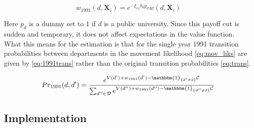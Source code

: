 \begin{equation}
    w_{1991}(d, \mathbf{X}_i) = e^{- \xi_{ex} b_d p_d} w(d, \mathbf{X}_i)
    \label{eq:exog_var}
\end{equation}

Here $p_d$ is a dummy set to $1$ if $d$ is a public university.  Since this payoff
cut is sudden and temporary, it does not affect
expectations in the value function.  What this means for the estimation is that
for the single year 1991 transition probabilities between departments 
in the movement likelihood \eqref{eq:mov_liks} are given by \eqref{eq:1991trans} rather than
the original transition probabilities \eqref{eq:trans}.\footnotemark{}

\begin{equation}
    Pr_{1991}(d,d') = \frac{e^{V(d') + w_{1991}(d') - \mathbbm{1}_{\{d'\neq d\}}\mathcal{C}}}{\sum_{d'' \in \mathcal{D}} e^{V(d'') + w_{1991}(d'') - \mathbbm{1}_{\{d''\neq d\}} \mathcal{C}}}
    \label{eq:1991trans}
\end{equation}

\subsection{Implementation}

